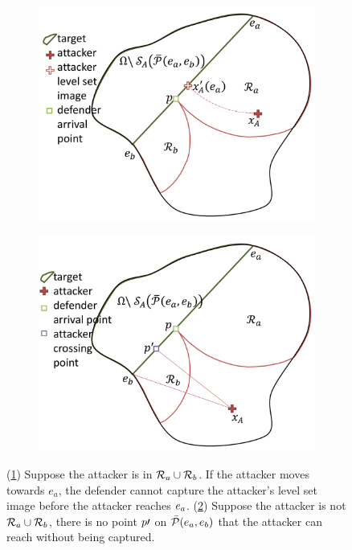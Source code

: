 \begin{figure}[h]
\centering
	\begin{subfigure}{0.3\textwidth}
	\centering
	\includegraphics[width=\textwidth]{"fig/attacker in Ra"}
	\caption{\label{subfig:ainra}}
	\end{subfigure} \quad
	\begin{subfigure}{0.3\textwidth}
	\centering
	\includegraphics[width=\textwidth]{"fig/attacker outside Ra U Rb"}
	\caption{\label{subfig:aoutra}}
	\end{subfigure}
\caption{(\ref{subfig:ainra}) Suppose the attacker is in $\mathcal{R}_a\cup\mathcal{R}_b$. If the attacker moves towards $e_a$, the defender cannot capture the attacker's level set image before the attacker reaches $e_a$. (\ref{subfig:aoutra}) Suppose the attacker is not $\mathcal{R}_a\cup\mathcal{R}_b$, there is no point $p\prime$ on $\bar{\mathcal{P}}(e_a,e_b)$ that the attacker can reach without being captured.}
\label{fig:lemma1}
\end{figure}

